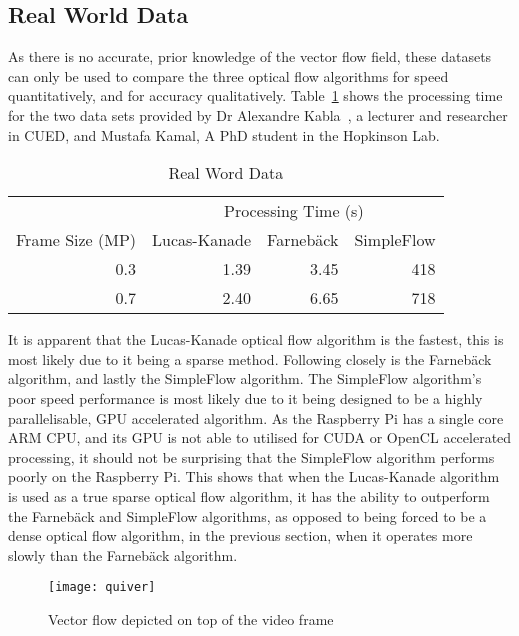 \subsection{Real World Data}

As there is no accurate, prior knowledge of the vector flow field, these datasets can only be used to compare the three optical flow algorithms for speed quantitatively, and for accuracy qualitatively. Table~\ref{tab:realworld} shows the processing time for the two data sets provided by Dr Alexandre Kabla~\cite{harris2012characterizing}, a lecturer and researcher in CUED, and Mustafa Kamal, A PhD student in the Hopkinson Lab.
 
\begin{table}[htbp]
 \centering
 \begin{tabular}{r|rrr}
   \toprule
   & \multicolumn{3}{c}{Processing Time (s)} \\
   Frame Size (MP) & Lucas-Kanade &  Farnebäck &  SimpleFlow \\
   \midrule
   0.3   & 1.39  & 3.45  & 418 \\
   0.7   & 2.40  & 6.65  & 718 \\
   \bottomrule
  \end{tabular}
  \caption{Real Word Data}
  \label{tab:realworld}
\end{table}

It is apparent that the Lucas-Kanade optical flow algorithm is the fastest, this is most likely due to it being a sparse method. Following closely is the Farnebäck algorithm, and lastly the SimpleFlow algorithm. The SimpleFlow algorithm's poor speed performance is most likely due to it being designed to be a highly parallelisable, GPU accelerated algorithm. As the Raspberry Pi has a single core ARM CPU, and its GPU is not able to utilised for CUDA or OpenCL accelerated processing, it should not be surprising that the SimpleFlow algorithm performs poorly on the Raspberry Pi. This shows that when the Lucas-Kanade algorithm is used as a true sparse optical flow algorithm, it has the ability to outperform the Farnebäck and SimpleFlow algorithms, as opposed to being forced to be a dense optical flow algorithm, in the previous section, when it operates more slowly than the Farnebäck algorithm.

\begin{figure}[h!]
  \centering
  \texttt{[image: quiver]}
  \caption{Vector flow depicted on top of the video frame}
  \label{fig:quiver}
\end{figure}

